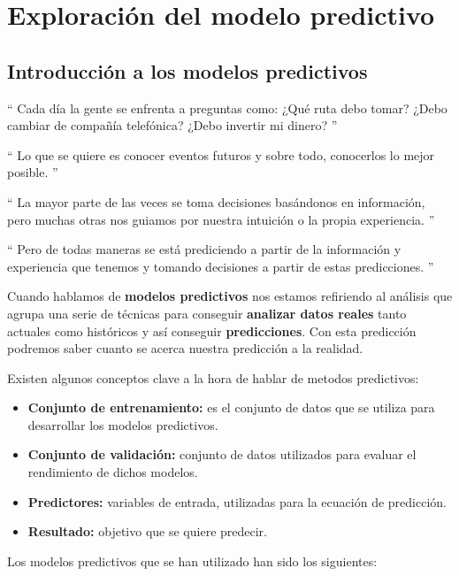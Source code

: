 \cleardoublepage

\chapter{Exploración del modelo predictivo}
\label{makereference4}

\section{Introducción a los modelos predictivos}
\label{makereference4.1}

 `` Cada día la gente se enfrenta a preguntas como: ¿Qué ruta debo tomar? ¿Debo cambiar de compañía telefónica? ¿Debo invertir mi dinero? ''
 
`` Lo que se quiere es conocer eventos futuros y sobre todo, conocerlos lo mejor posible. ''

`` La mayor parte de las veces se toma decisiones basándonos en información, pero muchas otras nos guiamos por nuestra intuición o la propia experiencia. ''

`` Pero de todas maneras se está prediciendo a partir de la información y experiencia que tenemos y tomando decisiones a partir de estas predicciones. '' 


Cuando hablamos de \textbf{modelos predictivos} nos estamos refiriendo al análisis que agrupa una serie de técnicas para conseguir \textbf{analizar datos reales} tanto actuales como históricos y así conseguir \textbf{predicciones}. Con esta predicción podremos saber cuanto se acerca nuestra predicción a la realidad.

Existen algunos conceptos clave a la hora de hablar de metodos predictivos:

	\begin{itemize}
	\item \textbf{Conjunto de entrenamiento:} es el conjunto de datos que se utiliza para desarrollar los modelos predictivos.
	\item \textbf{Conjunto de validación:} conjunto de datos utilizados para evaluar el rendimiento de dichos modelos.
	\item \textbf{Predictores:} variables de entrada, utilizadas para la ecuación de predicción. 
	\item \textbf{Resultado:} objetivo que se quiere predecir.
\end{itemize}

Los modelos predictivos que se han utilizado han sido los siguientes:


